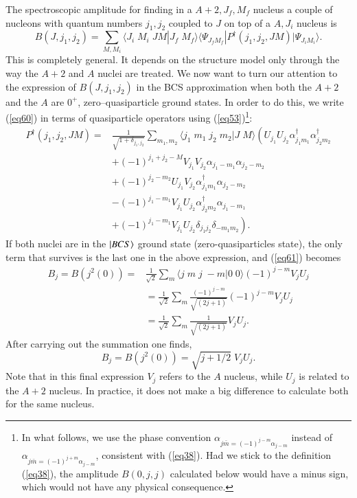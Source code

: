 \begin{subappendices}
The spectroscopic amplitude for finding in a $A+2,J_f,M_f$ nucleus a couple of nucleons with quantum numbers $j_1,j_2$ coupled to $J$ on top of a $A,J_i$ nucleus is
\begin{equation}\label{eq61}
B(J,j_1,j_2)=\sum_{M,M_i} \langle J_i \; M_i \; J M|J_f \; M_f\rangle \langle \Psi_{J_f M_f}|P^\dagger(j_1,j_2,J M)|\Psi_{J_i M_i}\rangle.
\end{equation}
This is completely general. It depends on the structure model only through the way the $A+2$ and $A$ nuclei are treated. We now want to turn our attention to the expression of $B(J,j_1,j_2)$ in the BCS approximation when both the $A+2$ and the $A$ are $0^+$, zero--quasiparticle ground states. In order to do this, we write (\ref{eq60}) in terms of quasiparticle operators using (\ref{eq53})\footnote{In what follows, we use the phase convention $\alpha_{j \bar m=(-1)^{j-m}\alpha_{j-m}}$ instead of $\alpha_{j \bar m=(-1)^{j+m}\alpha_{j-m}}$, consistent with (\ref{eq38}). Had we stick to the definition (\ref{eq38}), the amplitude $B(0,j,j)$ calculated below would have a minus sign, which would not have any physical consequence.}:
\begin{equation}\label{eq62}
    \begin{split}
       P^\dagger(j_1,j_2,J M)= & \frac{1}{\sqrt{1+\delta_{j_1,j_2}}}\sum_{m_1,m_2} \langle j_1 \; m_1 \;j_2 \;m_2|J \; M\rangle \left( U_{j_1}U_{j_2}\alpha_{j_1m_1}^\dagger\alpha_{j_2m_2}^\dagger\right.\\
         &  +(-1)^{j_1+j_2-M}V_{j_1}V_{j_2}\alpha_{j_1-m_1}\alpha_{j_2-m_2}\\
         &+(-1)^{j_2-m_2}U_{j_1}V_{j_2}\alpha_{j_1m_1}^\dagger
         \alpha_{j_2-m_2}\\
         &-(-1)^{j_1-m_1} V_{j_1}U_{j_2}\alpha_{j_2m_2}^\dagger\alpha_{j_1-m_1}\\
         &\left.+(-1)^{j_1-m_1} V_{j_1}U_{j_2}\delta_{j_1j_2}\delta_{-m_1m_2}\right).
     \end{split}
\end{equation}
If both nuclei are in the $|{BCS} \rangle$ ground state (zero-quasiparticles state), the only term that survives is the last one in the above expression, and (\ref{eq61}) becomes
\begin{equation}\label{eq63}
    \begin{split}
     B_j=B(j^2(0))=& \frac{1}{\sqrt 2}\sum_{m} \langle j \; m \; j\;-m |0 \; 0\rangle (-1)^{j-m} V_jU_j\\
         &=\frac{1}{\sqrt 2}\sum_{m} \frac{(-1)^{j-m}}{\sqrt{(2j+1)}} (-1)^{j-m} V_jU_j\\
         &=\frac{1}{\sqrt 2}\sum_{m} \frac{1}{\sqrt{(2j+1)}}V_jU_j.
     \end{split}
\end{equation}
After carrying out the summation one finds,
\begin{equation}\label{eq64}
 B_j=B(j^2(0))=\sqrt{j+1/2}\;V_jU_j.
\end{equation}
Note that in this final expression $V_j$ refers to the $A$ nucleus, while $U_j$ is related to the $A+2$ nucleus. In practice, it does not make a big difference to calculate both for the same nucleus.


\end{subappendices}
